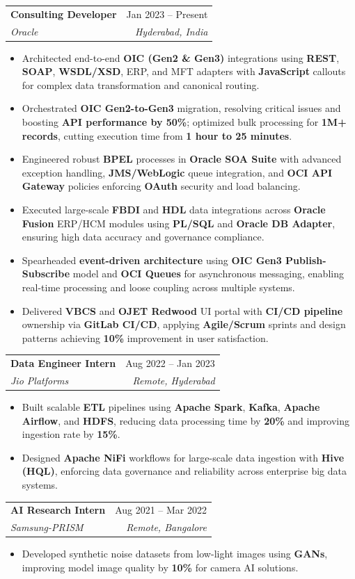 \documentclass[letterpaper,11pt]{article}
\makeatletter
\newcommand{\resumeItem}[1]{
  \item\small{
    {#1 \vspace{-2pt}}
  }
}
\newcommand{\resumeSubheading}[4]{
  \vspace{-2pt}\item
    \begin{tabular*}{0.97\textwidth}[t]{l@{\extracolsep{\fill}}r}
      \textbf{#1} & #2 \\
      \textit{\small#3} & \textit{\small #4} \\
    \end{tabular*}\vspace{-7pt}
}
\newcommand{\resumeItemListStart}{\begin{itemize}}
\newcommand{\resumeItemListEnd}{\end{itemize}\vspace{-5pt}}
\makeatother
\begin{document}
    \resumeSubheading
      {Consulting Developer}{Jan 2023 -- Present}
      {Oracle}{Hyderabad, India}
      \resumeItemListStart
        \resumeItem{Architected end-to-end \textbf{OIC (Gen2 \& Gen3)} integrations using \textbf{REST}, \textbf{SOAP}, \textbf{WSDL/XSD}, ERP, and MFT adapters with \textbf{JavaScript} callouts for complex data transformation and canonical routing.}
        \resumeItem{Orchestrated \textbf{OIC Gen2-to-Gen3} migration, resolving critical issues and boosting \textbf{API performance by 50\%}; optimized bulk processing for \textbf{1M+ records}, cutting execution time from \textbf{1 hour to 25 minutes}.}
        \resumeItem{Engineered robust \textbf{BPEL} processes in \textbf{Oracle SOA Suite} with advanced exception handling, \textbf{JMS/WebLogic} queue integration, and \textbf{OCI API Gateway} policies enforcing \textbf{OAuth} security and load balancing.}
        \resumeItem{Executed large-scale \textbf{FBDI} and \textbf{HDL} data integrations across \textbf{Oracle Fusion} ERP/HCM modules using \textbf{PL/SQL} and \textbf{Oracle DB Adapter}, ensuring high data accuracy and governance compliance.}
        \resumeItem{Spearheaded \textbf{event-driven architecture} using \textbf{OIC Gen3 Publish-Subscribe} model and \textbf{OCI Queues} for asynchronous messaging, enabling real-time processing and loose coupling across multiple systems.}
        \resumeItem{Delivered \textbf{VBCS} and \textbf{OJET Redwood} UI portal with \textbf{CI/CD pipeline} ownership via \textbf{GitLab CI/CD}, applying \textbf{Agile/Scrum} sprints and design patterns achieving \textbf{10\%} improvement in user satisfaction.}
      \resumeItemListEnd

    \resumeSubheading
      {Data Engineer Intern}{Aug 2022 -- Jan 2023}
      {Jio Platforms}{Remote, Hyderabad}
      \resumeItemListStart
        \resumeItem{Built scalable \textbf{ETL} pipelines using \textbf{Apache Spark}, \textbf{Kafka}, \textbf{Apache Airflow}, and \textbf{HDFS}, reducing data processing time by \textbf{20\%} and improving ingestion rate by \textbf{15\%}.}
        \resumeItem{Designed \textbf{Apache NiFi} workflows for large-scale data ingestion with \textbf{Hive (HQL)}, enforcing data governance and reliability across enterprise big data systems.}
      \resumeItemListEnd

    \resumeSubheading
      {AI Research Intern}{Aug 2021 -- Mar 2022}
      {Samsung-PRISM}{Remote, Bangalore}
      \resumeItemListStart
        \resumeItem{Developed synthetic noise datasets from low-light images using \textbf{GANs}, improving model image quality by \textbf{10\%} for camera AI solutions.}
      \resumeItemListEnd
\end{document}
